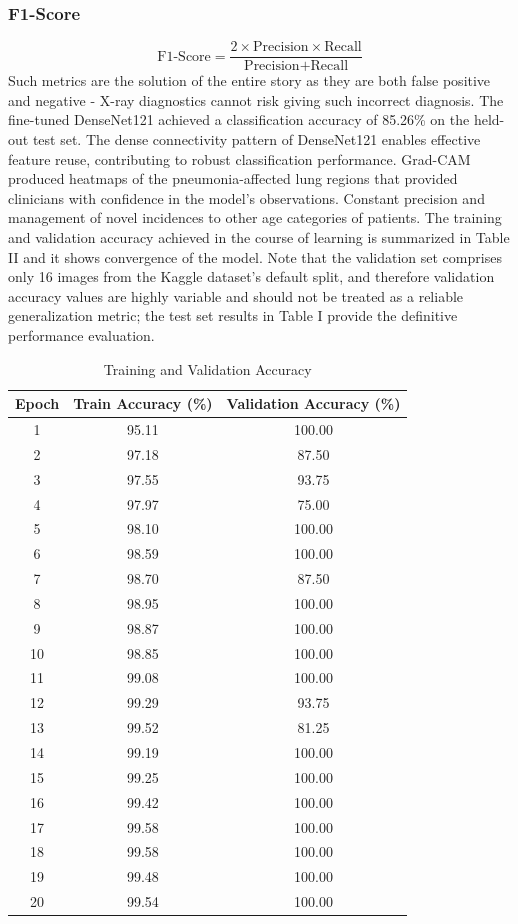 \documentclass[conference]{IEEEtran}
\begin{document}
\subsubsection{F1-Score}
\begin{equation}
\text{F1-Score} = \frac{2 \times \text{Precision} \times \text{Recall}}{\text{Precision} + \text{Recall}}
\end{equation}
Such metrics are the solution of the entire story as they are both false positive and negative - X-ray diagnostics cannot risk giving such incorrect diagnosis. The fine-tuned DenseNet121 achieved a classification accuracy of 85.26\% on the held-out test set. The dense connectivity pattern of DenseNet121 enables effective feature reuse, contributing to robust classification performance. Grad-CAM produced heatmaps of the pneumonia-affected lung regions that provided clinicians with confidence in the model's observations. Constant precision and management of novel incidences to other age categories of patients. The training and validation accuracy achieved in the course of learning is summarized in Table II and it shows convergence of the model. Note that the validation set comprises only 16 images from the Kaggle dataset's default split, and therefore validation accuracy values are highly variable and should not be treated as a reliable generalization metric; the test set results in Table I provide the definitive performance evaluation.\\
\begin{table}[h]
\centering
\caption{Training and Validation Accuracy}
\label{tab:epoch_accuracy}
\begin{tabular}{|c|c|c|}
\hline
\textbf{Epoch} & \textbf{Train Accuracy (\%)} & \textbf{Validation Accuracy (\%)} \\ \hline
1  & 95.11 & 100.00 \\ \hline
2  & 97.18 & 87.50 \\ \hline
3  & 97.55 & 93.75 \\ \hline
4  & 97.97 & 75.00 \\ \hline
5  & 98.10 & 100.00 \\ \hline
6  & 98.59 & 100.00 \\ \hline
7  & 98.70 & 87.50 \\ \hline
8  & 98.95 & 100.00 \\ \hline
9  & 98.87 & 100.00 \\ \hline
10 & 98.85 & 100.00 \\ \hline
11 & 99.08 & 100.00 \\ \hline
12 & 99.29 & 93.75 \\ \hline
13 & 99.52 & 81.25 \\ \hline
14 & 99.19 & 100.00 \\ \hline
15 & 99.25 & 100.00 \\ \hline
16 & 99.42 & 100.00 \\ \hline
17 & 99.58 & 100.00 \\ \hline
18 & 99.58 & 100.00 \\ \hline
19 & 99.48 & 100.00 \\ \hline
20 & 99.54 & 100.00 \\ \hline
\end{tabular}
\end{table}
\end{document}
